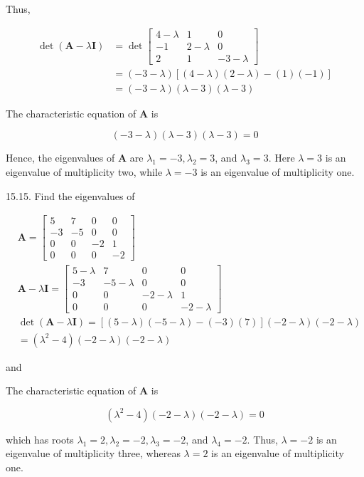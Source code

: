 \documentclass[10pt]{article}
\begin{document}
Thus,

$$
\begin{aligned}
\operatorname{det}(\mathbf{A}-\lambda \mathbf{I}) & =\operatorname{det}\left[\begin{array}{ccc}
4-\lambda & 1 & 0 \\
-1 & 2-\lambda & 0 \\
2 & 1 & -3-\lambda
\end{array}\right] \\
& =(-3-\lambda)[(4-\lambda)(2-\lambda)-(1)(-1)] \\
& =(-3-\lambda)(\lambda-3)(\lambda-3)
\end{aligned}
$$

The characteristic equation of $\mathbf{A}$ is

$$
(-3-\lambda)(\lambda-3)(\lambda-3)=0
$$

Hence, the eigenvalues of $\mathbf{A}$ are $\lambda_{1}=-3, \lambda_{2}=3$, and $\lambda_{3}=3$. Here $\lambda=3$ is an eigenvalue of multiplicity two, while $\lambda=-3$ is an eigenvalue of multiplicity one.

15.15. Find the eigenvalues of

$$
\begin{aligned}
& \mathbf{A}=\left[\begin{array}{rrrr}
5 & 7 & 0 & 0 \\
-3 & -5 & 0 & 0 \\
0 & 0 & -2 & 1 \\
0 & 0 & 0 & -2
\end{array}\right] \\
& \mathbf{A}-\lambda \mathbf{I}=\left[\begin{array}{cccc}
5-\lambda & 7 & 0 & 0 \\
-3 & -5-\lambda & 0 & 0 \\
0 & 0 & -2-\lambda & 1 \\
0 & 0 & 0 & -2-\lambda
\end{array}\right] \\
& \operatorname{det}(\mathbf{A}-\lambda \mathbf{I})=[(5-\lambda)(-5-\lambda)-(-3)(7)](-2-\lambda)(-2-\lambda) \\
& =\left(\lambda^{2}-4\right)(-2-\lambda)(-2-\lambda)
\end{aligned}
$$

and

The characteristic equation of $\mathbf{A}$ is

$$
\left(\lambda^{2}-4\right)(-2-\lambda)(-2-\lambda)=0
$$

which has roots $\lambda_{1}=2, \lambda_{2}=-2, \lambda_{3}=-2$, and $\lambda_{4}=-2$. Thus, $\lambda=-2$ is an eigenvalue of multiplicity three, whereas $\lambda=2$ is an eigenvalue of multiplicity one.
\end{document}
